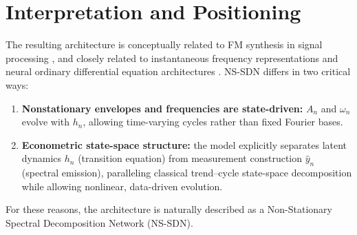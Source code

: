 \section{Interpretation and Positioning}
The resulting architecture is conceptually related to FM synthesis in signal processing \citep{chowning1973}, and closely related to instantaneous frequency representations \citep{huang1998} and neural ordinary differential equation architectures \citep{chen2018}. NS-SDN differs in two critical ways:
\begin{enumerate}
\item \textbf{Nonstationary envelopes and frequencies are state-driven:} $A_n$ and $\omega_n$ evolve with $h_n$, allowing time-varying cycles rather than fixed Fourier bases.
\item \textbf{Econometric state-space structure:} the model explicitly separates latent dynamics $h_n$ (transition equation) from measurement construction $\hat y_n$ (spectral emission), paralleling classical trend--cycle state-space decomposition \citep{harvey1989,durbin2012} while allowing nonlinear, data-driven evolution.
\end{enumerate}
For these reasons, the architecture is naturally described as a Non-Stationary Spectral Decomposition Network (NS-SDN).
